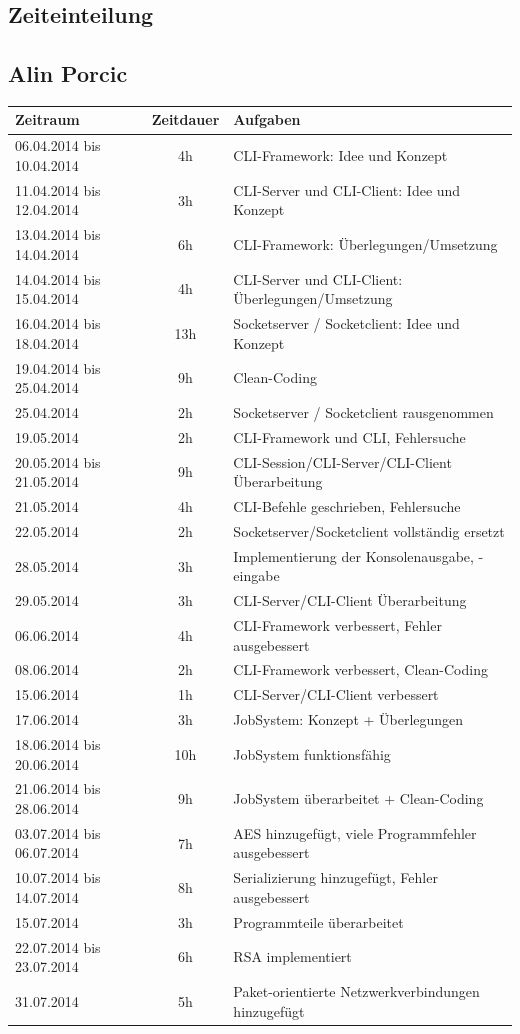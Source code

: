 \documentclass[12pt,a4paper]{report}
\begin{document}
\begin{onehalfspace}
\part{Zeiteinteilung}

\chapter{Alin Porcic}

\begin{center}
\begin{tabular}{|l|c|l|}

\hline
\textbf{Zeitraum} & \textbf{Zeitdauer} & \textbf{Aufgaben} \\ \hline
06.04.2014 bis 10.04.2014 & 4h & CLI-Framework: Idee und Konzept\\
11.04.2014 bis 12.04.2014 & 3h & CLI-Server und CLI-Client: Idee und Konzept\\
13.04.2014 bis 14.04.2014 & 6h & CLI-Framework: Überlegungen/Umsetzung\\
14.04.2014 bis 15.04.2014 & 4h & CLI-Server und CLI-Client: Überlegungen/Umsetzung\\
16.04.2014 bis 18.04.2014 & 13h & Socketserver / Socketclient: Idee und Konzept\\
19.04.2014 bis 25.04.2014 & 9h & Clean-Coding\\
25.04.2014 & 2h & Socketserver / Socketclient rausgenommen\\
19.05.2014 & 2h & CLI-Framework und CLI, Fehlersuche\\
20.05.2014 bis 21.05.2014 & 9h & CLI-Session/CLI-Server/CLI-Client Überarbeitung\\
21.05.2014 & 4h & CLI-Befehle geschrieben, Fehlersuche\\
22.05.2014 & 2h & Socketserver/Socketclient vollständig ersetzt\\
28.05.2014 & 3h & Implementierung der Konsolenausgabe, -eingabe\\
29.05.2014 & 3h & CLI-Server/CLI-Client Überarbeitung\\
06.06.2014 & 4h & CLI-Framework verbessert, Fehler ausgebessert\\
08.06.2014 & 2h & CLI-Framework verbessert, Clean-Coding\\
15.06.2014 & 1h & CLI-Server/CLI-Client verbessert\\
17.06.2014 & 3h & JobSystem: Konzept + Überlegungen\\
18.06.2014 bis 20.06.2014 & 10h & JobSystem funktionsfähig\\
21.06.2014 bis 28.06.2014 & 9h & JobSystem überarbeitet + Clean-Coding\\
03.07.2014 bis 06.07.2014 & 7h & AES hinzugefügt, viele Programmfehler ausgebessert\\
10.07.2014 bis 14.07.2014 & 8h & Serializierung hinzugefügt, Fehler ausgebessert\\
15.07.2014 & 3h & Programmteile überarbeitet\\
22.07.2014 bis 23.07.2014 & 6h & RSA implementiert\\
31.07.2014 & 5h & Paket-orientierte Netzwerkverbindungen hinzugefügt\\ \hline
  

\end{tabular}
\end{center}
\end{onehalfspace}
\end{document}
